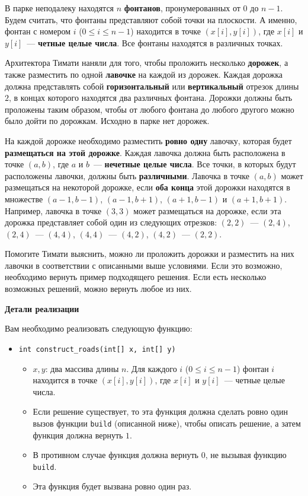 В парке неподалеку находятся $n$ \textbf{фонтанов}, пронумерованных от $0$ до $n-1$.
Будем считать, что фонтаны представляют собой точки на плоскости.
А именно, фонтан с номером $i$ ($0\leq i\leq n-1$) находится в точке $(x[i],y[i])$, где $x[i]$ и $y[i]$~--- \textbf{четные целые числа}.
Все фонтаны находятся в различных точках.

Архитектора Тимати наняли для того, чтобы проложить несколько \textbf{дорожек}, а также разместить по одной \textbf{лавочке} на каждой из дорожек.
Каждая дорожка должна представлять собой \textbf{горизонтальный} или \textbf{вертикальный} отрезок длины $2$, в концах которого находятся два различных фонтана. Дорожки должны быть проложены таким образом, чтобы от любого фонтана до любого другого можно было дойти по дорожкам. Исходно в парке нет дорожек.

На каждой дорожке необходимо разместить \textbf{ровно одну} лавочку, которая будет \textbf{размещаться на этой дорожке}.
Каждая лавочка должна быть расположена в точке $(a, b)$, где $a$ и $b$~--- \textbf{нечетные целые числа}.
Все точки, в которых будут расположены лавочки, должны быть \textbf{различными}.
Лавочка в точке $(a,b)$ может размещаться на некоторой дорожке, если \textbf{оба конца} этой дорожки находятся в множестве $(a-1,b-1)$, $(a-1,b+1)$, $(a+1,b-1)$ и $(a+1,b+1)$.
Например, лавочка в точке $(3,3)$ может размещаться на дорожке, если эта дорожка представляет собой один из следующих отрезков: $(2,2)$~--- $(2,4)$, $(2,4)$~--- $(4,4)$, $(4,4)$~--- $(4,2)$, $(4,2)$~--- $(2,2)$.

Помогите Тимати выяснить, можно ли проложить дорожки и разместить на них лавочки в соответствии с описанными выше условиями. Если это возможно, необходимо вернуть пример подходящего решения. Если есть несколько возможных решений, можно вернуть любое из них.

\textbf{Детали реализации}

Вам необходимо реализовать следующую функцию:

\begin{itemize}
\item \texttt{int construct\_roads(int[] x, int[] y)}
\begin{itemize}
\item $x,y$: два массива длины $n$. Для каждого $i$ ($0\leq i\leq n-1$) фонтан $i$ находится в точке $(x[i],y[i])$, где $x[i]$ и $y[i]$~--- четные целые числа.
\item Если решение существует, то эта функция должна сделать ровно один вызов функции \texttt{build} (описанной ниже), чтобы описать решение, а затем функция должна вернуть $1$.
\item В противном случае функция должна вернуть $0$, не вызывая функцию \texttt{build}.
\item Эта функция будет вызвана ровно один раз.
\end{itemize}
\end{itemize}

